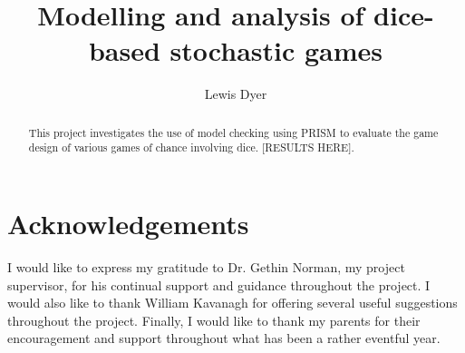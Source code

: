 \documentclass{l4proj}
\theoremstyle{definition}
\begin{document}
\title{Modelling and analysis of dice-based stochastic games}
\author{Lewis Dyer}
\date{}

\maketitle

\begin{abstract}
    This project investigates the use of model checking using PRISM to evaluate the game design of various games of chance involving dice. [RESULTS HERE].
\end{abstract}


%
%
%
\def\consentname {Lewis Dyer}
\def\consentdate {}
\educationalconsent

\chapter*{Acknowledgements}

I would like to express my gratitude to Dr. Gethin Norman, my project supervisor, for his continual support and guidance throughout the project. I would also like to thank William Kavanagh for offering several useful suggestions throughout the project. Finally, I would like to thank my parents for their encouragement and support throughout what has been a rather eventful year.

\tableofcontents
\end{document}
